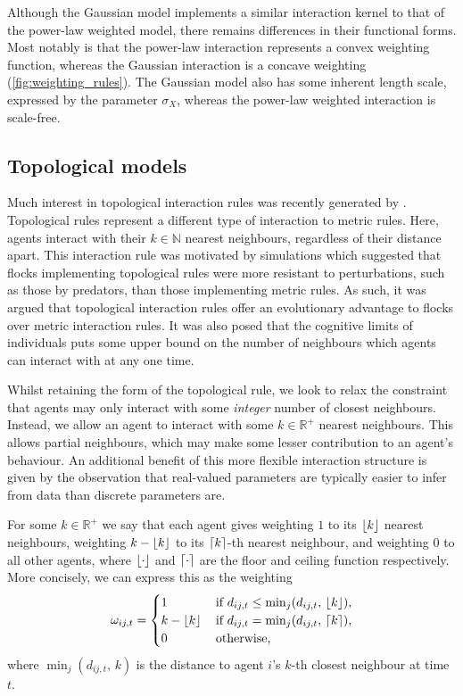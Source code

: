 Although the Gaussian model implements a similar interaction kernel to that of the
power-law weighted model, there remains differences in their functional forms.  Most
notably is that the power-law interaction represents a convex weighting function, whereas
the Gaussian interaction is a concave weighting (\cref{fig:weighting_rules}). The Gaussian
model also has some inherent length scale, expressed by the parameter $\sigma_X$, whereas
the power-law weighted interaction is scale-free.

\subsection{Topological models}

Much interest in topological interaction rules was recently generated by
\cite{ballerini08}. Topological rules represent a different type of interaction to metric
rules. Here, agents interact with their $k\in\mathbb{N}$ nearest neighbours, regardless of
their distance apart. This interaction rule was motivated by simulations which suggested
that flocks implementing topological rules were more resistant to perturbations, such as
those by predators, than those implementing metric rules. As such, it was argued that
topological interaction rules offer an evolutionary advantage to flocks over metric
interaction rules.
It was also posed that the cognitive limits of individuals puts some upper bound on the
number of neighbours which agents can interact with at any one time.

Whilst retaining the form of the topological rule, we look to relax the constraint that
agents may only interact with some \emph{integer} number of closest neighbours.  Instead,
we allow an agent to interact with some $k\in\mathbb{R}^+$ nearest neighbours.  This
allows partial neighbours, which may make some lesser contribution to an agent's
behaviour. An additional benefit of this more flexible interaction structure is given by
the observation that real-valued parameters are typically easier to infer from data than
discrete parameters are.

For some $k\in\mathbb{R}^+$ we say that each agent gives weighting $1$ to its $\lfloor k\rfloor$
nearest neighbours, weighting $k - \lfloor k\rfloor$ to its $\lceil k\rceil$-th nearest neighbour, and
weighting $0$ to all other agents, where $\lfloor\cdot\rfloor$ and $\lceil\cdot\rceil$ are the floor
and ceiling function respectively. More concisely, we can express this as the weighting
\begin{equation}
    \label{eq:top_interaction}
	\omega_{ij,t} =
	\begin{cases}
		1           & \, \text{if } d_{ij, t} \leq \min_j(d_{ij,t},\, \lfloor k\rfloor), \\
		k-\lfloor k\rfloor & \, \text{if } d_{ij, t} = \min_j(d_{ij,t},\, \lceil k\rceil),     \\
		0           & \, \text{otherwise,}
	\end{cases}
\end{equation}
where $\min_j(d_{ij,t},\, k)$ is the distance to agent $i$'s $k$-th closest neighbour at
time $t$. 

